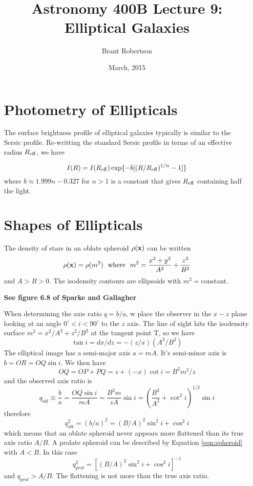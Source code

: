 \documentclass[]{article}
\title{Astronomy 400B Lecture 9: Elliptical Galaxies}
\author{Brant Robertson}
\date{March, 2015}
\begin{document}
\maketitle

\section{Photometry of Ellipticals}

The surface brightness profile of elliptical galaxies typically is similar to the Sersic profile.  Re-writting
the standard Sersic profile in terms of an effective radius $R_{\mathrm{eff}}$, we have

\begin{equation}
I(R) = I(R_{\mathrm{eff}})\exp\{-b[(R/R_{\mathrm{eff}})^{1/n}-1]\}
\end{equation}
\noindent
where $b\approx 1.999n-0.327$ for $n>1$ is a constant that gives $R_{\mathrm{eff}}$ containing half the light.


\section{Shapes of Ellipticals}

The density of stars in an oblate spheroid $\rho(\mathbf{x})$ can be written
\begin{equation}
\label{eqn:spheroid}
\rho(\mathbf{x}) = \rho(m^2)~~\mathrm{where}~~m^2 = \frac{x^2 + y^2}{A^2}+\frac{z^2}{B^2}
\end{equation}
\noindent
and $A>B>0$.  The isodensity contours are ellipsoids with $m^2 = $constant.

{\bf See figure 6.8 of Sparke and Gallagher}

When determining the axis ratio $q=b/a$, w place the observer in the $x-z$ plane
looking at an angle $0^\circ < i < 90^\circ$ to the $z$ axis.
The line of sight hits the isodensity surface $m^2 = x^2 / A^2 + z^2/B^2$ 
at the tangent point T, so we have
\begin{equation}
\tan i = dx/dz = -(z/x)(A^2/B^2)
\end{equation}
\noindent
The elliptical image has a semi-major axis $a=mA$.  It's semi-minor
axis is $b=OR=OQ\sin i$.  We then have
\begin{equation}
OQ = OP+PQ = z+(-x)\cot i = B^2m^2/z
\end{equation}
\noindent
and the observed axis ratio is
\begin{equation}
q_{obl} \equiv \frac{b}{a} = \frac{OQ \sin i}{mA} = \frac{B^2 m}{zA}\sin i = \left(\frac{B^2}{A^2} + \cot^2 i\right)^{1/2}\sin i
\end{equation}
\noindent
therefore
\begin{equation}
q_{obl}^2 = (b/a)^2 = (B/A)^2\sin^2 i + \cos^2 i
\end{equation}
\noindent
which means that an oblate spheroid never appears more flattened than its true axis ratio $A/B$.
A prolate spheroid can be described by Equation \ref{eqn:spheroid} with $A<B$.  In this case
\begin{equation}
q_{prol}^2 = [(B/A)^2 \sin^2 i + \cos^2 i]^{-1}
\end{equation}
\noindent
and $q_{prol}>A/B$.  The flattening is not more than the true axis ratio.
\end{document}

